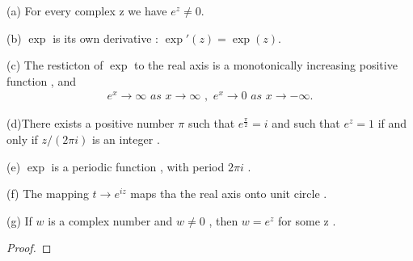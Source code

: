 \documentclass[11pt]{elegantbook}
\begin{document}
\begin{theorem}\label{theorem:The conclusions of exponential function}
  (a) For every complex z we have $e^z \ne 0$.

  (b) $\exp$ is its own derivative : $\exp'(z)=\exp(z)$.

  (c) The resticton of $\exp$ to the real axis is a monotonically increasing positive function , and 
  \begin{align*}
    e^x\rightarrow \infty\,\,as\,\, x\rightarrow \infty\,\,,\,\, e^x\rightarrow 0\,\,as\,\, x\rightarrow -\infty .
  \end{align*}

  (d)There exists a positive number $\pi$ such that $e^{\frac{\pi}{2}}=i$ and such that $e^z=1$ if and only if $z/(2\pi i)$ is an integer .

  (e) $\exp$ is a periodic function , with period $2\pi i$ .

  (f) The mapping $t\to e^{iz}$ maps tha the real axis onto unit circle .

  (g) If $w$ is a complex number and $w\ne 0$ , then $w=e^z$ for some z .
\end{theorem}
\begin{proof}
  
\end{proof}
\end{document}
